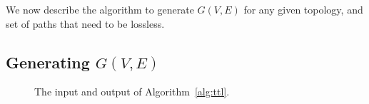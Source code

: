 We now describe the algorithm to generate $G(V,E)$ for any given topology, and set of
paths that need to be lossless. 

\subsection{Generating $G(V,E)$} 
\begin{figure}[t]
	\centering
	\caption{The input and output of Algorithm~\ref{alg:ttl}.}\label{fig:three_node}
\end{figure}

